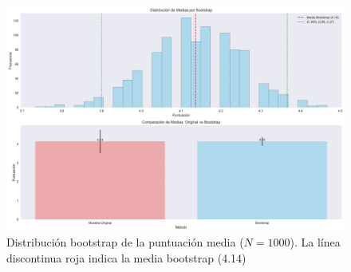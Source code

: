 \documentclass[10pt]{llncs}
\begin{document}
\begin{figure}
\centering
\includegraphics[width=1\textwidth]{../src/experiments/specialized_agents/bootstrap_distribution_20250617-171856.png}
\caption{Distribución bootstrap de la puntuación media ($N=1000$). La línea discontinua roja indica la media bootstrap (4.14)}
\label{fig:boot_dist_2}
\end{figure}
\end{document}
